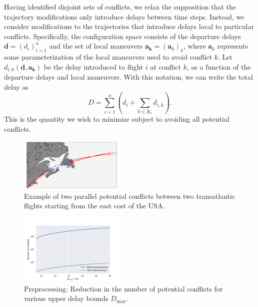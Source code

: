 Having identified disjoint sets of conflicts, we relax the supposition that the trajectory modifications only introduce delays between time steps.
Instead, we consider modifications to the trajectories that introduce delays local to particular conflicts.
Specifically, the configuration space consists of the departure delays $\mathbf d = {\left(d_i\right)}_{i=1}^n$ and the set of local maneuvers $\mathbf a_{\mathbf k} = {\left(\mathbf a_k\right)}_k$, where $\mathbf a_k$ represents some parameterization of the local maneuvers used to avoid conflict $k$.
Let $d_{i, k} (\mathbf d, \mathbf a_{\mathbf k})$ be the delay introduced to flight $i$ at conflict $k$, as a function of the departure delays and local maneuvers.
With this notation, we can write the total delay as
\begin{equation}
D = 
\sum_{i = 1}^{n}
\left(d_i + \sum_{k \in K_i} d_{i, k}\right).
\end{equation}
This is the quantity we wish to minimize subject to avoiding all potential conflicts.
\begin{figure}[p]
    \begin{center}
        \includegraphics[width=0.45\textwidth]{./pics/example_conflict_in_real_space.pdf}
    \end{center}
    \caption[Conflict example]{Example of two parallel potential conflicts between two transatlantic flights starting from the east cost of the USA.}
\label{fig:example_parallel_conflict}
\end{figure}

\begin{figure}[p]
    \begin{center}
        \includegraphics[width=0.45\textwidth]{./pics/preprocessing_reduction_number_of_conflicts.pdf}
    \end{center}
    \caption[Conflict preproccesing]{Preprocessing: Reduction in the number of potential conflicts for various upper delay bounds $D_\text{max}$.}
\label{fig:preprocessing_reduction_number_of_conflicts}
\end{figure}


